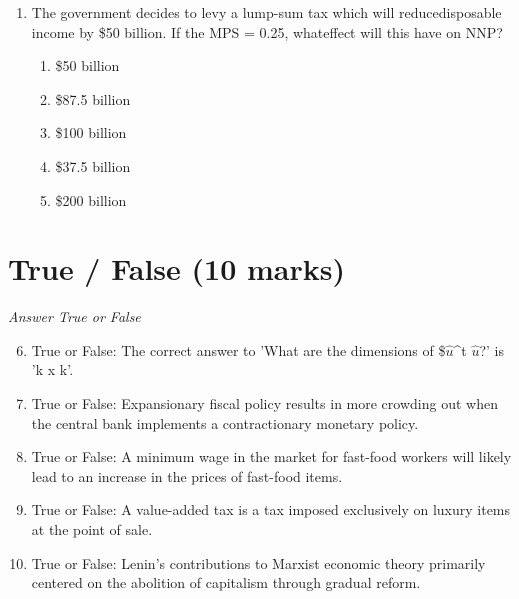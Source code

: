 \documentclass[12pt]{article}
\begin{document}
\begin{enumerate}[label=\arabic*.]
\begin{enumerate}[label=(\alph*)]
    \item the demand for goods and services decreases.
    \item the stock market crashes.
    \item bond prices fall.
    \item the nominal interest rate falls.
    \item the unemployment rate rises.
\end{enumerate}
\item The government decides to levy a lump-sum tax which will reducedisposable income by \$50 billion. If the MPS = 0.25, whateffect will this have on NNP?
\begin{enumerate}[label=(\alph*)]
    \item \$50 billion
    \item \$87.5 billion
    \item \$100 billion
    \item \$37.5 billion
    \item \$200 billion
\end{enumerate}
\end{enumerate}

\section*{True / False (10 marks)}
\textit{Answer True or False}
\begin{enumerate}[label=\arabic*.]
\setcounter{enumi}{5}
\item True or False: The correct answer to 'What are the dimensions of \$\ensuremath{\hat{u}}^t \ensuremath{\hat{u}}?' is 'k x k'.
\item True or False: Expansionary fiscal policy results in more crowding out when the central bank implements a contractionary monetary policy.
\item True or False: A minimum wage in the market for fast-food workers will likely lead to an increase in the prices of fast-food items.
\item True or False: A value-added tax is a tax imposed exclusively on luxury items at the point of sale.
\item True or False: Lenin's contributions to Marxist economic theory primarily centered on the abolition of capitalism through gradual reform.
\end{enumerate}
\end{document}
